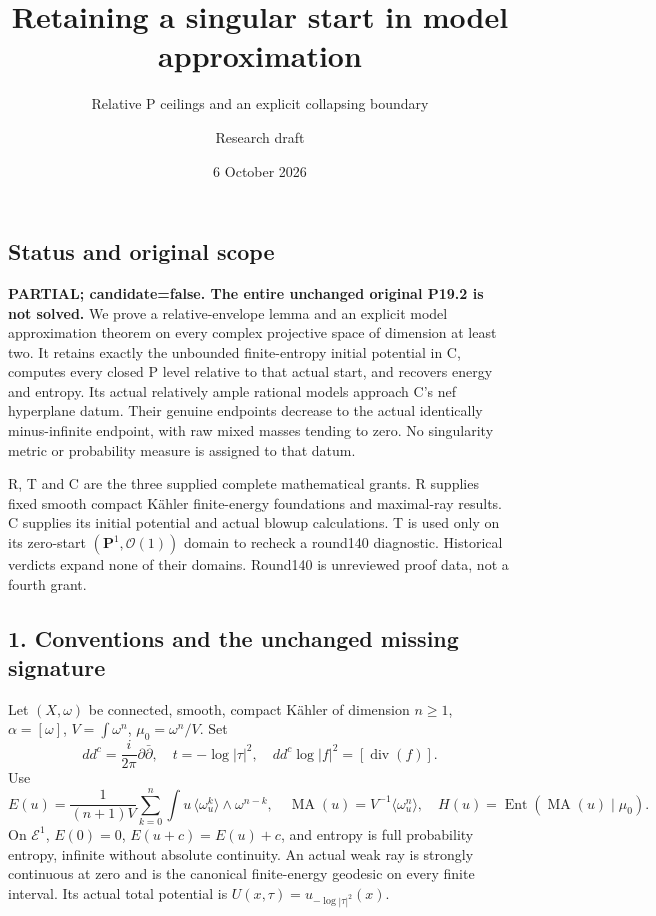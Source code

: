\documentclass[
  11pt,
]{article}
\title{Retaining a singular start in model approximation}
\subtitle{Relative P ceilings and an explicit collapsing boundary}
\author{Research draft}
\date{6 October 2026}
\begin{document}
\maketitle

\subsection{Status and original scope}\label{status-and-original-scope}

\textbf{PARTIAL; candidate=false. The entire unchanged original P19.2 is
not solved.} We prove a relative-envelope lemma and an explicit model
approximation theorem on every complex projective space of dimension at
least two. It retains exactly the unbounded finite-entropy initial
potential in C, computes every closed P level relative to that actual
start, and recovers energy and entropy. Its actual relatively ample
rational models approach C's nef hyperplane datum. Their genuine
endpoints decrease to the actual identically minus-infinite endpoint,
with raw mixed masses tending to zero. No singularity metric or
probability measure is assigned to that datum.

R, T and C are the three supplied complete mathematical grants. R
supplies fixed smooth compact Kähler finite-energy foundations and
maximal-ray results. C supplies its initial potential and actual blowup
calculations. T is used only on its zero-start
\((\mathbf P^1,\mathcal O(1))\) domain to recheck a round140 diagnostic.
Historical verdicts expand none of their domains. Round140 is unreviewed
proof data, not a fourth grant.

\subsection{1. Conventions and the unchanged missing
signature}\label{conventions-and-the-unchanged-missing-signature}

Let \((X,\omega)\) be connected, smooth, compact Kähler of dimension
\(n\ge1\), \(\alpha=[\omega]\), \(V=\int\omega^n\),
\(\mu_0=\omega^n/V\). Set \[
dd^c=\frac{i}{2\pi}\partial\bar\partial,\quad t=-\log|\tau|^2,\quad
dd^c\log|f|^2=[\operatorname{div}(f)].
\] Use \[
E(u)=\frac1{(n+1)V}\sum_{k=0}^n\int u\,
\langle\omega_u^k\rangle\wedge\omega^{n-k},\quad
\operatorname{MA}(u)=V^{-1}\langle\omega_u^n\rangle,\quad
H(u)=\operatorname{Ent}(\operatorname{MA}(u)\mid\mu_0).
\] On \(\mathcal E^1\), \(E(0)=0\), \(E(u+c)=E(u)+c\), and entropy is
full probability entropy, infinite without absolute continuity. An
actual weak ray is strongly continuous at zero and is the canonical
finite-energy geodesic on every finite interval. Its actual total
potential is \(U(x,\tau)=u_{-\log|\tau|^2}(x)\).
\end{document}
